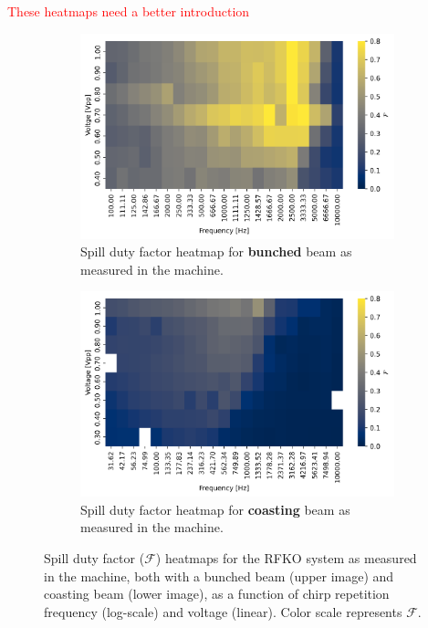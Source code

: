 \documentclass[11pt]{report}
\newcommand\todo[1]{\textcolor{red}{#1}}
\begin{document}
\todo{These heatmaps need a better introduction}

\begin{figure}[h]
  \centering
  \begin{subfigure}[b]{0.9\linewidth}
    \includegraphics*[width=\linewidth]{sdf_on_meas.png}
    \caption{Spill duty factor heatmap for \textbf{bunched} beam as measured in the machine.}\label{sdf_on_meas}
  \end{subfigure}
  \begin{subfigure}[b]{0.9\linewidth}
    \includegraphics*[width=\linewidth]{sdf_off_meas.png}
    \caption{Spill duty factor heatmap for \textbf{coasting} beam as measured in the machine.}\label{sdf_off_meas}
  \end{subfigure}
  \cprotect\caption{Spill duty factor ($\mathcal{F}$) heatmaps for the RFKO system as measured in the machine, both with a bunched beam (upper image) and coasting beam (lower image), as a function of chirp repetition frequency (log-scale) and voltage (linear). Color scale represents $\mathcal{F}$.}\label{fig:sdf_meas}
\end{figure}
\end{document}

